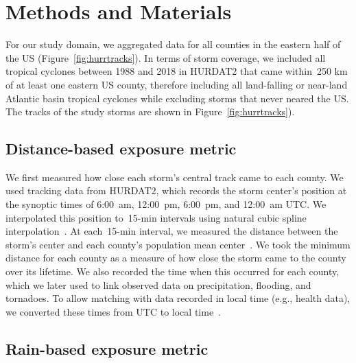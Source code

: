 \section*{Methods and Materials}

For our study domain, we aggregated data for all counties in the eastern half
of the \ac{US} (Figure~\ref{fig:hurrtracks}).  In terms of storm coverage, we
included all tropical cyclones between 1988 and 2018 in \ac{HURDAT2}
\parencite{landsea2013} that came within~250 \si{\kilo\metre} of at least one
eastern \ac{US} county, therefore including all land-falling or near-land
Atlantic basin tropical cyclones while excluding storms that never neared the
\ac{US}. The tracks of the study storms are shown in
Figure~\ref{fig:hurrtracks}).

\subsection*{Distance-based exposure metric}

We first measured how close each storm's central track came to each county. We
used tracking data from \ac{HURDAT2}, which records the storm center's position
at the synoptic times of 6:00~am, 12:00~pm, 6:00~pm, and 12:00~am \ac{UTC}.  We
interpolated this position to~15-\si{\minute} intervals using natural cubic
spline interpolation~\parencite{hurricaneexposure}. At each~15-\si{\minute}
interval, we measured the distance between the storm's center and each county's
population mean center~\parencite{bivand2013applied, countycenters}. We took
the minimum distance for each county as a measure of how close the storm came
to the county over its lifetime.  We also recorded the time when this occurred
for each county, which we later used to link observed data on precipitation,
flooding, and tornadoes.  To allow matching with data recorded in
local time (e.g., health data), we converted these times from \ac{UTC} to local
time~\parencite{countytimezones}.

\subsection*{Rain-based exposure metric}

